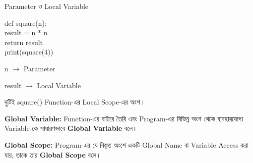 \begin{codeoutputbox}{Parameter ও Local Variable}

\noindent
\begin{minipage}[t]{0.53\linewidth}
\codeheading

\begin{english}
\ttfamily
def square(n):\\
\hspace*{4mm}result = n * n\\
\hspace*{4mm}return result\\[0.5mm]
print(square(4))
\end{english}

\end{minipage}
\hfill
\begin{minipage}[t]{0.43\linewidth}
\outputheading

\begin{center}
\textenglish{}
\end{center}

\textenglish{\ttfamily n}
\(\longrightarrow\)
Parameter

\medskip

\textenglish{\ttfamily result}
\(\longrightarrow\)
Local Variable

\medskip

দুটিই
\textenglish{\ttfamily square()}
Function-এর Local Scope-এর অংশ।

\end{minipage}

\end{codeoutputbox}



\begin{definitionbox}

\textbf{Global Variable:}
Function-এর বাইরে তৈরি এবং Program-এর বিভিন্ন অংশ থেকে
ব্যবহারযোগ্য Variable-কে সাধারণভাবে \textbf{Global Variable} বলে।

\medskip

\textbf{Global Scope:}
Program-এর যে বিস্তৃত অংশে একটি Global Name বা Variable
Access করা যায়, তাকে তার \textbf{Global Scope} বলে।

\end{definitionbox}

